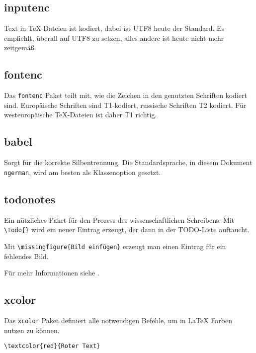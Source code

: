 

\subsection{inputenc}

Text in \TeX-Dateien ist kodiert, dabei ist UTF8 heute der Standard. Es empfiehlt, überall auf UTF8 zu setzen, alles andere ist heute nicht mehr zeitgemäß.

\subsection{fontenc}

Das \texttt{fontenc} Paket teilt mit, wie die Zeichen in den genutzten Schriften kodiert sind. Europäische Schriften sind T1-kodiert, russische Schriften T2 kodiert. Für westeuropäische \TeX-Dateien ist daher T1 richtig.

\subsection{babel}

Sorgt für die korrekte Silbentrennung. Die Standardsprache, in diesem Dokument \texttt{ngerman}, wird am besten als Klassenoption gesetzt.

\subsection{todonotes}

Ein nützliches Paket für den Prozess des wissenschaftlichen Schreibens. Mit \verb|\todo{}| wird ein neuer Eintrag erzeugt, der dann in der TODO-Liste auftaucht. 

Mit \verb|\missingfigure{Bild einfügen}| erzeugt man einen Eintrag für ein fehlendes Bild.

Für mehr Informationen siehe \cite{todonotes}.

\subsection{xcolor}

Das \texttt{xcolor} Paket definiert alle notwendigen Befehle, um in \LaTeX{} Farben nutzen zu können.

\begin{lstlisting}
\textcolor{red}{Roter Text}
\end{lstlisting}

